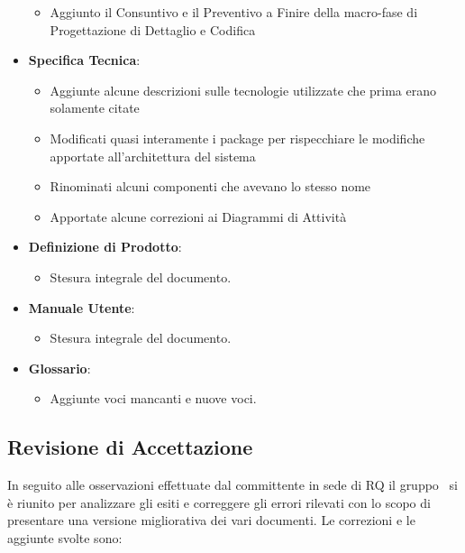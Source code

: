 \begin{itemize}
\begin{itemize}
		\item Aggiunto il Consuntivo e il Preventivo a Finire della macro-fase di Progettazione di Dettaglio e Codifica
	\end{itemize}	
	\item \textbf{Specifica Tecnica}:
	\begin{itemize}
		\item Aggiunte alcune descrizioni sulle tecnologie utilizzate che prima erano solamente citate
		\item Modificati quasi interamente i package per rispecchiare le modifiche apportate all'architettura del sistema
		\item Rinominati alcuni componenti che avevano lo stesso nome
		\item Apportate alcune correzioni ai Diagrammi di Attività
	\end{itemize}
	\item \textbf{Definizione di Prodotto}:
	\begin{itemize}
		\item Stesura integrale del documento.
	\end{itemize}
	\item \textbf{Manuale Utente}:
	\begin{itemize}
		\item Stesura integrale del documento.
	\end{itemize}	
	\item \textbf{Glossario}:
	\begin{itemize}
		\item Aggiunte voci mancanti e nuove voci.
	\end{itemize}
\end{itemize}

\subsection{Revisione di Accettazione}
In seguito alle osservazioni effettuate dal committente in sede di RQ il gruppo \gruppo\ si è riunito per analizzare gli esiti e correggere gli errori rilevati con lo scopo di presentare una versione migliorativa dei vari documenti.
Le correzioni e le aggiunte svolte sono:

